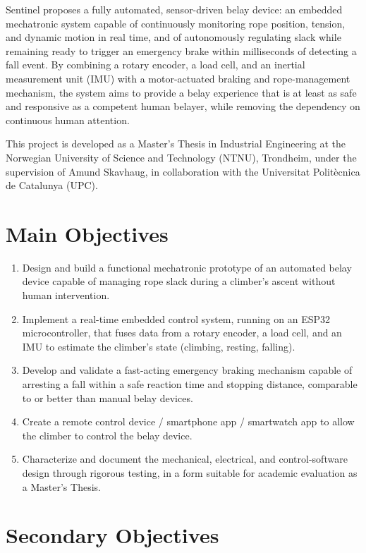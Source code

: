 \documentclass[11pt, a4paper]{article}
\begin{document}
Sentinel proposes a fully automated, sensor-driven belay device: an
embedded mechatronic system capable of continuously monitoring rope
position, tension, and dynamic motion in real time, and of autonomously
regulating slack while remaining ready to trigger an emergency brake
within milliseconds of detecting a fall event. By combining a rotary
encoder, a load cell, and an inertial measurement unit (IMU) with a
motor-actuated braking and rope-management mechanism, the system aims to
provide a belay experience that is at least as safe and responsive as a
competent human belayer, while removing the dependency on continuous human
attention.

This project is developed as a Master's Thesis in Industrial Engineering
at the Norwegian University of Science and Technology (NTNU), Trondheim,
under the supervision of Amund Skavhaug, in collaboration with the
Universitat Politècnica de Catalunya (UPC).

\section{Main Objectives}

\begin{enumerate}[leftmargin=1.2cm]
    \item Design and build a functional mechatronic prototype of an
        automated belay device capable of managing rope slack during a
        climber's ascent without human intervention.
    \item Implement a real-time embedded control system, running on an
        ESP32 microcontroller, that fuses data from a rotary encoder, a
        load cell, and an IMU to estimate the climber's state (climbing,
        resting, falling).
    \item Develop and validate a fast-acting emergency braking mechanism
        capable of arresting a fall within a safe reaction time and
        stopping distance, comparable to or better than manual belay
        devices.
    \item Create a remote control device / smartphone app / smartwatch app to allow the climber to control the belay device.
    \item Characterize and document the mechanical, electrical, and
        control-software design through rigorous testing, in a form
        suitable for academic evaluation as a Master's Thesis.
\end{enumerate}

\section{Secondary Objectives}
\end{document}
